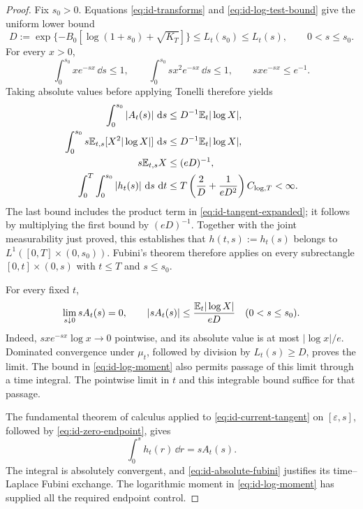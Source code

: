 \begin{proof}
Fix $s_0>0$.
Equations \eqref{eq:id-transforms} and \eqref{eq:id-log-test-bound} give the uniform lower bound
\begin{equation}
 D:=\exp\{-B_0[\log(1+s_0)+\sqrt{K_T}]\}
 \le L_t(s_0)\le L_t(s),\qquad 0<s\le s_0.
 \label{eq:id-transform-lower-bound}
\end{equation}
For every $x>0$,
\[
 \int_0^{s_0}xe^{-sx}\,\dd s\le1,\qquad
 \int_0^{s_0}sx^2e^{-sx}\,\dd s\le1,\qquad
 sx e^{-sx}\le e^{-1}.
\]
Taking absolute values before applying Tonelli therefore yields
\begin{equation}
 \begin{aligned}
 \int_0^{s_0}|A_t(s)|\,\mathop{}\!\mathrm d s
       &\le D^{-1}\mathbb E_t|\log X|,\\
 \int_0^{s_0}s\mathbb E_{t,s}[X^2|\log X|]\,\mathop{}\!\mathrm d s
       &\le D^{-1}\mathbb E_t|\log X|,\\
 s\mathbb E_{t,s}X&\le(eD)^{-1},\\
 \int_0^T\int_0^{s_0}|h_t(s)|\,\mathop{}\!\mathrm d s\,\mathop{}\!\mathrm d t
       &\le T\left(\frac2D+\frac1{eD^2}\right)C_{\log,T}<\infty.
 \end{aligned}
 \label{eq:id-absolute-fubini}
\end{equation}
The last bound includes the product term in \eqref{eq:id-tangent-expanded}; it follows by multiplying the first bound by $(eD)^{-1}$.
Together with the joint measurability just proved, this establishes that $h(t,s):=h_t(s)$ belongs to $L^1([0,T]\times(0,s_0))$.
Fubini's theorem therefore applies on every subrectangle $[0,t]\times(0,s)$ with $t\le T$ and $s\le s_0$.

For every fixed $t$,
\begin{equation}
 \lim_{s\downarrow0}sA_t(s)=0,
 \qquad |sA_t(s)|\le\frac{\mathbb E_t|\log X|}{eD}\quad(0<s\le s_0).
 \label{eq:id-zero-endpoint}
\end{equation}
Indeed, $sx e^{-sx}\log x\to0$ pointwise, and its absolute value is at most $|\log x|/e$.
Dominated convergence under $\mu_t$, followed by division by $L_t(s)\ge D$, proves the limit.
The bound in \eqref{eq:id-log-moment} also permits passage of this limit through a time integral.
The pointwise limit in $t$ and this integrable bound suffice for that passage.

The fundamental theorem of calculus applied to \eqref{eq:id-current-tangent} on $[\varepsilon,s]$, followed by \eqref{eq:id-zero-endpoint}, gives
\[
 \int_0^s h_t(r)\,\dd r=sA_t(s).
\]
The integral is absolutely convergent, and \eqref{eq:id-absolute-fubini} justifies its time--Laplace Fubini exchange.
The logarithmic moment in \eqref{eq:id-log-moment} has supplied all the required endpoint control.


\end{proof}
